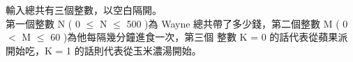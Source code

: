 輸入總共有三個整數，以空白隔開。\\
第一個整數 N ( 0 $\leq$ N $\leq$ 500 )為 Wayne 總共帶了多少錢，第二個整數 M ( 0 $<$ M $\leq$ 60 )為他每隔幾分鐘進食一次，第三個 整數 K = 0 的話代表從蘋果派開始吃，K = 1 的話則代表從玉米濃湯開始。\\
